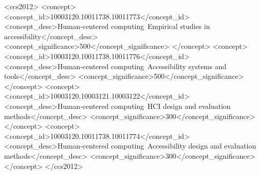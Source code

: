 \documentclass[nonacm,screen,anonymous=false]{acmart}
\begin{document}
\begin{CCSXML}
<ccs2012>
   <concept>
       <concept_id>10003120.10011738.10011773</concept_id>
       <concept_desc>Human-centered computing~Empirical studies in accessibility</concept_desc>
       <concept_significance>500</concept_significance>
       </concept>
   <concept>
       <concept_id>10003120.10011738.10011776</concept_id>
       <concept_desc>Human-centered computing~Accessibility systems and tools</concept_desc>
       <concept_significance>500</concept_significance>
       </concept>
   <concept>
       <concept_id>10003120.10003121.10003122</concept_id>
       <concept_desc>Human-centered computing~HCI design and evaluation methods</concept_desc>
       <concept_significance>300</concept_significance>
       </concept>
   <concept>
       <concept_id>10003120.10011738.10011774</concept_id>
       <concept_desc>Human-centered computing~Accessibility design and evaluation methods</concept_desc>
       <concept_significance>300</concept_significance>
       </concept>
 </ccs2012>
\end{CCSXML}




\maketitle
\end{document}
